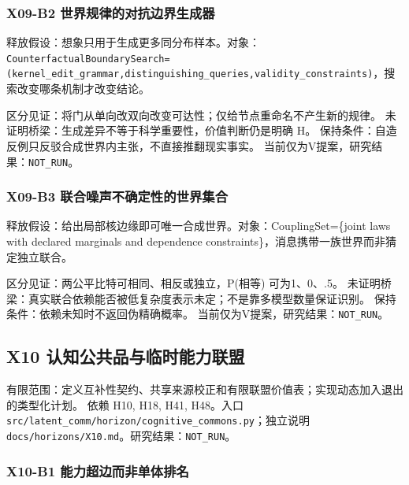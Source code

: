 \documentclass[
  10pt,
]{article}
\begin{document}
\subsubsection{X09-B2
世界规律的对抗边界生成器}\label{x09-b2-ux4e16ux754cux89c4ux5f8bux7684ux5bf9ux6297ux8fb9ux754cux751fux6210ux5668}

释放假设：想象只用于生成更多同分布样本。对象：\nolinkurl{CounterfactualBoundarySearch=(kernel_edit_grammar,distinguishing_queries,validity_constraints)}，搜索改变哪条机制才改变结论。

区分见证：将门从单向改双向改变可达性；仅给节点重命名不产生新的规律。
未证明桥梁：生成差异不等于科学重要性，价值判断仍是明确 H。
保持条件：自造反例只反驳合成世界内主张，不直接推翻现实事实。
当前仅为V提案，研究结果：\nolinkurl{NOT_RUN}。

\subsubsection{X09-B3
联合噪声不确定性的世界集合}\label{x09-b3-ux8054ux5408ux566aux58f0ux4e0dux786eux5b9aux6027ux7684ux4e16ux754cux96c6ux5408}

释放假设：给出局部核边缘即可唯一合成世界。对象：CouplingSet=\{joint laws
with declared marginals and dependence
constraints\}，消息携带一族世界而非猜定独立联合。

区分见证：两公平比特可相同、相反或独立，P(相等) 可为1、0、.5。
未证明桥梁：真实联合依赖能否被低复杂度表示未定；不是靠多模型数量保证识别。
保持条件：依赖未知时不返回伪精确概率。
当前仅为V提案，研究结果：\nolinkurl{NOT_RUN}。

\subsection{X10
认知公共品与临时能力联盟}\label{x10-ux8ba4ux77e5ux516cux5171ux54c1ux4e0eux4e34ux65f6ux80fdux529bux8054ux76df}

有限范围：定义互补性契约、共享来源校正和有限联盟价值表；实现动态加入退出的类型化计划。
依赖 H10, H18, H41, H48。入口
{\small\nolinkurl{src/latent_comm/horizon/cognitive_commons.py}}；独立说明
{\small\nolinkurl{docs/horizons/X10.md}}。研究结果：\nolinkurl{NOT_RUN}。

\subsubsection{X10-B1
能力超边而非单体排名}\label{x10-b1-ux80fdux529bux8d85ux8fb9ux800cux975eux5355ux4f53ux6392ux540d}
\end{document}
